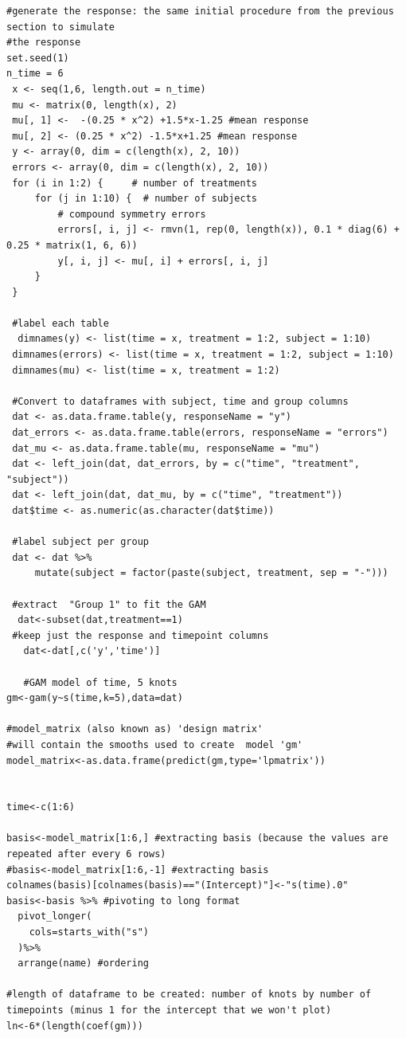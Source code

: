 \documentclass[Royal,times,sagev]{sagej}
\begin{document}
\begin{verbatim}
#generate the response: the same initial procedure from the previous section to simulate
#the response
set.seed(1)
n_time = 6
 x <- seq(1,6, length.out = n_time)
 mu <- matrix(0, length(x), 2)
 mu[, 1] <-  -(0.25 * x^2) +1.5*x-1.25 #mean response
 mu[, 2] <- (0.25 * x^2) -1.5*x+1.25 #mean response
 y <- array(0, dim = c(length(x), 2, 10))
 errors <- array(0, dim = c(length(x), 2, 10))
 for (i in 1:2) {     # number of treatments
     for (j in 1:10) {  # number of subjects
         # compound symmetry errors
         errors[, i, j] <- rmvn(1, rep(0, length(x)), 0.1 * diag(6) + 0.25 * matrix(1, 6, 6))
         y[, i, j] <- mu[, i] + errors[, i, j]
     }
 }
 
 #label each table
  dimnames(y) <- list(time = x, treatment = 1:2, subject = 1:10)
 dimnames(errors) <- list(time = x, treatment = 1:2, subject = 1:10)
 dimnames(mu) <- list(time = x, treatment = 1:2)
 
 #Convert to dataframes with subject, time and group columns
 dat <- as.data.frame.table(y, responseName = "y")
 dat_errors <- as.data.frame.table(errors, responseName = "errors")
 dat_mu <- as.data.frame.table(mu, responseName = "mu")
 dat <- left_join(dat, dat_errors, by = c("time", "treatment", "subject"))
 dat <- left_join(dat, dat_mu, by = c("time", "treatment"))
 dat$time <- as.numeric(as.character(dat$time))
 
 #label subject per group
 dat <- dat %>%
     mutate(subject = factor(paste(subject, treatment, sep = "-")))
  
 #extract  "Group 1" to fit the GAM
  dat<-subset(dat,treatment==1)
 #keep just the response and timepoint columns
   dat<-dat[,c('y','time')]

   #GAM model of time, 5 knots
gm<-gam(y~s(time,k=5),data=dat)

#model_matrix (also known as) 'design matrix'
#will contain the smooths used to create  model 'gm'
model_matrix<-as.data.frame(predict(gm,type='lpmatrix'))


time<-c(1:6)

basis<-model_matrix[1:6,] #extracting basis (because the values are repeated after every 6 rows)
#basis<-model_matrix[1:6,-1] #extracting basis
colnames(basis)[colnames(basis)=="(Intercept)"]<-"s(time).0"
basis<-basis %>% #pivoting to long format
  pivot_longer(
    cols=starts_with("s")
  )%>%
  arrange(name) #ordering

#length of dataframe to be created: number of knots by number of timepoints (minus 1 for the intercept that we won't plot)
ln<-6*(length(coef(gm))) 


\end{verbatim}
\end{document}
